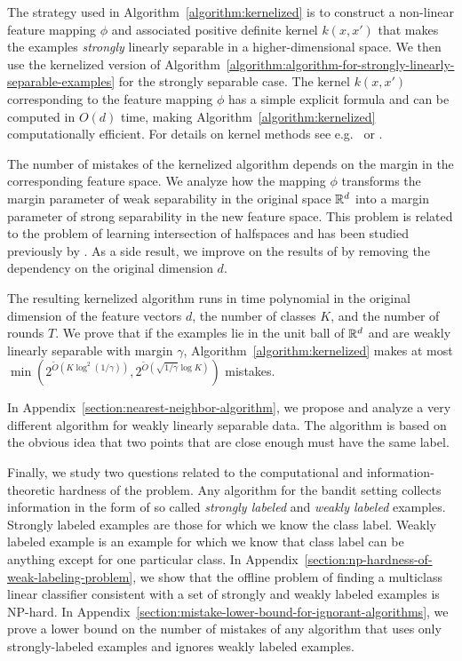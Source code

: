 The strategy used in Algorithm~\ref{algorithm:kernelized} is to construct a
non-linear feature mapping $\phi$ and associated positive definite kernel
$k(x,x')$ that makes the examples \emph{strongly} linearly separable in a
higher-dimensional space. We then use the kernelized version of
Algorithm~\ref{algorithm:algorithm-for-strongly-linearly-separable-examples} for
the strongly separable case. The kernel $k(x,x')$ corresponding to the feature
mapping $\phi$ has a simple explicit formula and can be computed in $O(d)$ time,
making Algorithm~\ref{algorithm:kernelized} computationally efficient. For
details on kernel methods see e.g.~\citep{Scholkopf-Smola-2002} or
\citep{Shawe-Taylor-Cristianini-2004}.

The number of mistakes of the kernelized algorithm depends on the margin in the
corresponding feature space. We analyze how the mapping $\phi$ transforms the
margin parameter of weak separability in the original space $\mathbb{R}^d$ into a margin
parameter of strong separability in the new feature space. This problem is
related to the problem of learning intersection of halfspaces and has been
studied previously by \citet{Klivans-Servedio-2008}. As a side result, we
improve on the results of \citet{Klivans-Servedio-2008} by removing the
dependency on the original dimension $d$.

The resulting kernelized algorithm runs in time polynomial in the
original dimension of the feature vectors $d$, the number of classes $K$, and
the number of rounds $T$. We prove that if the examples lie in the unit ball of
$\mathbb{R}^d$ and are weakly linearly separable with margin $\gamma$,
Algorithm~\ref{algorithm:kernelized} makes at
most $\min (2^{\widetilde{O}(K \log^2
(1/\gamma))}, 2^{\widetilde{O}(\sqrt{1/\gamma} \log K)})$ mistakes.

In Appendix~\ref{section:nearest-neighbor-algorithm}, we propose and analyze a
very different algorithm for weakly linearly separable data. The algorithm is
based on the obvious idea that two points that are close enough must have the
same label.

Finally, we study two questions related to the computational and
information-theoretic hardness of the problem. Any algorithm for the bandit
setting collects information in the form of so called \emph{strongly labeled}
and \emph{weakly labeled} examples. Strongly labeled examples are those for
which we know the class label. Weakly labeled example is an example for which we
know that class label can be anything except for one particular class. In
Appendix~\ref{section:np-hardness-of-weak-labeling-problem}, we show that the
offline problem of finding a multiclass linear classifier consistent with a set
of strongly and weakly labeled examples is NP-hard. In
Appendix~\ref{section:mistake-lower-bound-for-ignorant-algorithms}, we prove a
lower bound on the number of mistakes of any algorithm that uses only
strongly-labeled examples and ignores weakly labeled examples.
